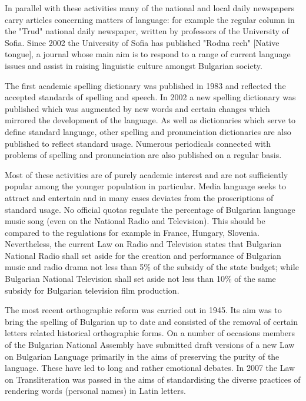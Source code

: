 \documentclass[]{../../metanetpaper}
\begin{document}
\begin{multicols}{2}
In parallel with these activities many of the national and local daily newspapers carry articles concerning matters of language: for example the regular column in the "Trud" national daily newspaper, written by professors of the University of Sofia. Since 2002 the University of Sofia has published "Rodna rech" [Native tongue], a journal whose main aim is to respond to a range of current language issues and assist in raising linguistic culture amongst Bulgarian society. 

The first academic spelling dictionary was published in 1983 and reflected the accepted standards of spelling and speech. In 2002 a new spelling dictionary was published which was augmented by new words and certain changes which mirrored the development of the language. As well as dictionaries which serve to define standard language, other spelling and pronunciation dictionaries are also published to reflect standard usage. Numerous periodicals connected with problems of spelling and pronunciation are also published on a regular basis. 

Most of these activities are of purely academic interest and are not sufficiently popular among the younger population in particular. Media language seeks to attract and entertain and in many cases deviates from the proscriptions of standard usage. No official quotas regulate the percentage of Bulgarian language music song (even on the National Radio and Television). This should be compared to the regulations for example in France, Hungary, Slovenia. Nevertheless, the current Law on Radio and Television states that Bulgarian National Radio shall set aside for the creation and performance of Bulgarian music and radio drama not less than 5\% of the subsidy of the state budget; while Bulgarian National Television shall set aside not less than 10\% of the same subsidy for Bulgarian television film production. 

The most recent orthographic reform was carried out in 1945. Its aim was to bring the spelling of Bulgarian up to date and consisted of the removal of certain letters related historical orthographic forms. On a number of occasions members of the Bulgarian National Assembly have submitted draft versions of a new Law on Bulgarian Language primarily in the aims of preserving the purity of the language. These have led to long and rather emotional debates. In 2007 the Law on Transliteration was passed in the aims of standardising the diverse practices of rendering words (personal names) in Latin letters.


\end{multicols}
\end{document}
